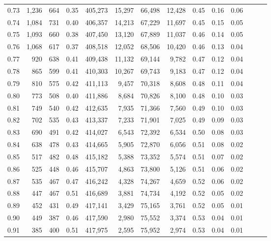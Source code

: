 \begin{tabular}{rrrrrrrrrrrrrr}
0.73 &  1,236 &    664 &  0.35 &  405,273 &   15,297 &  66,498 &  12,428 &  0.45 &  0.16 &      0.06 \\
0.74 &  1,084 &    731 &  0.40 &  406,357 &   14,213 &  67,229 &  11,697 &  0.45 &  0.15 &      0.05 \\
0.75 &  1,093 &    660 &  0.38 &  407,450 &   13,120 &  67,889 &  11,037 &  0.46 &  0.14 &      0.05 \\
0.76 &  1,068 &    617 &  0.37 &  408,518 &   12,052 &  68,506 &  10,420 &  0.46 &  0.13 &      0.04 \\
0.77 &    920 &    638 &  0.41 &  409,438 &   11,132 &  69,144 &   9,782 &  0.47 &  0.12 &      0.04 \\
0.78 &    865 &    599 &  0.41 &  410,303 &   10,267 &  69,743 &   9,183 &  0.47 &  0.12 &      0.04 \\
0.79 &    810 &    575 &  0.42 &  411,113 &    9,457 &  70,318 &   8,608 &  0.48 &  0.11 &      0.04 \\
0.80 &    773 &    508 &  0.40 &  411,886 &    8,684 &  70,826 &   8,100 &  0.48 &  0.10 &      0.03 \\
0.81 &    749 &    540 &  0.42 &  412,635 &    7,935 &  71,366 &   7,560 &  0.49 &  0.10 &      0.03 \\
0.82 &    702 &    535 &  0.43 &  413,337 &    7,233 &  71,901 &   7,025 &  0.49 &  0.09 &      0.03 \\
0.83 &    690 &    491 &  0.42 &  414,027 &    6,543 &  72,392 &   6,534 &  0.50 &  0.08 &      0.03 \\
0.84 &    638 &    478 &  0.43 &  414,665 &    5,905 &  72,870 &   6,056 &  0.51 &  0.08 &      0.02 \\
0.85 &    517 &    482 &  0.48 &  415,182 &    5,388 &  73,352 &   5,574 &  0.51 &  0.07 &      0.02 \\
0.86 &    525 &    448 &  0.46 &  415,707 &    4,863 &  73,800 &   5,126 &  0.51 &  0.06 &      0.02 \\
0.87 &    535 &    467 &  0.47 &  416,242 &    4,328 &  74,267 &   4,659 &  0.52 &  0.06 &      0.02 \\
0.88 &    447 &    467 &  0.51 &  416,689 &    3,881 &  74,734 &   4,192 &  0.52 &  0.05 &      0.02 \\
0.89 &    452 &    431 &  0.49 &  417,141 &    3,429 &  75,165 &   3,761 &  0.52 &  0.05 &      0.01 \\
0.90 &    449 &    387 &  0.46 &  417,590 &    2,980 &  75,552 &   3,374 &  0.53 &  0.04 &      0.01 \\
0.91 &    385 &    400 &  0.51 &  417,975 &    2,595 &  75,952 &   2,974 &  0.53 &  0.04 &      0.01 \\

\end{tabular}
